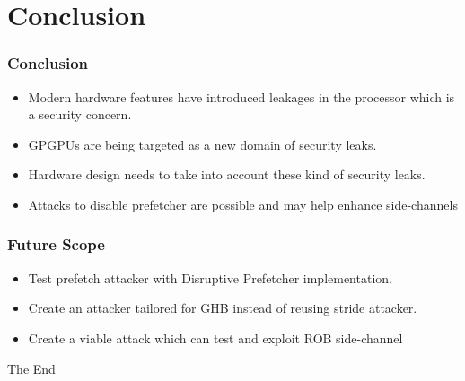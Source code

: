 \documentclass[10pt,usenames,dvipsnames]{beamer}
\begin{document}
\section{Conclusion}
\begin{frame}
\frametitle{Conclusion}
\begin{itemize}
    \item Modern hardware features have introduced leakages in the processor which is a security concern.
    \item GPGPUs are being targeted as a new domain of security leaks.
    \item Hardware design needs to take into account these kind of security leaks.
    \item Attacks to disable prefetcher are possible and may help enhance side-channels
\end{itemize}
\end{frame}

\begin{frame}
\frametitle{Future Scope}
\begin{itemize}
        \item Test prefetch attacker with Disruptive Prefetcher implementation.
        \item Create an attacker tailored for GHB instead of reusing stride attacker.
        \item Create a viable attack which can test and exploit ROB side-channel
\end{itemize}
\end{frame}

\begin{frame}
\Huge{\centerline{The End}}
\end{frame}
\end{document}
